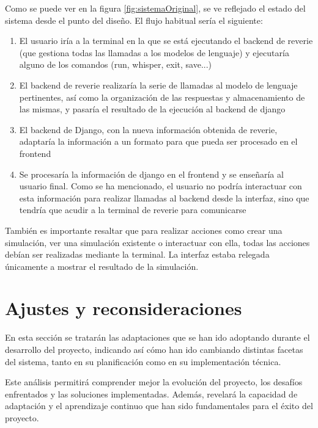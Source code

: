 Como se puede ver en la figura \ref{fig:sistemaOriginal}, se ve reflejado el estado del sistema desde el punto del diseño. El flujo habitual sería el siguiente:

\begin{enumerate}
	\item El usuario iría a la terminal en la que se está ejecutando el backend de reverie (que gestiona todas las llamadas a los modelos de lenguaje) y ejecutaría alguno de los comandos (run, whisper, exit, save...)
	
	\item El backend de reverie realizaría la serie de llamadas al modelo de lenguaje pertinentes, así como la organización de las respuestas y almacenamiento de las mismas, y pasaría el resultado de la ejecución al backend de django
	
	\item El backend de Django, con la nueva información obtenida de reverie, adaptaría la información a un formato para que pueda ser procesado en el frontend
	
	\item Se procesaría la información de django en el frontend y se enseñaría al usuario final. Como se ha mencionado, el usuario no podría interactuar con esta información para realizar llamadas al backend desde la interfaz, sino que tendría que acudir a la terminal de reverie para comunicarse
	
\end{enumerate}

También es importante resaltar que para realizar acciones como crear una simulación, ver una simulación existente o interactuar con ella, todas las acciones debían ser realizadas mediante la terminal. La interfaz estaba relegada únicamente a mostrar el resultado de la simulación.

\section{Ajustes y reconsideraciones}

En esta sección se tratarán las adaptaciones que se han ido adoptando durante el desarrollo del proyecto, indicando así cómo han ido cambiando distintas facetas del sistema, tanto en su planificación como en su implementación técnica.

Este análisis permitirá comprender mejor la evolución del proyecto, los desafíos enfrentados y las soluciones implementadas. Además, revelará la capacidad de adaptación y el aprendizaje continuo que han sido fundamentales para el éxito del proyecto.

